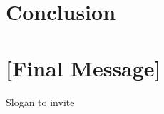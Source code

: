 \documentclass[11pt]{article}
\begin{document}
\section{Conclusion}

\section{[Final Message]}


\begin{center}
	\Large{Slogan to invite}
\end{center}
\end{document}

